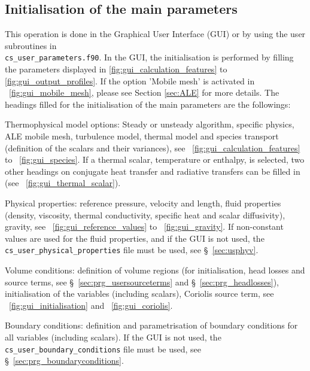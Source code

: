 {{{%
\subsection{Initialisation of the main parameters}

This operation is done in the Graphical User Interface (GUI) or by using the user subroutines in \\ \texttt{cs\_user\_parameters.f90}.
In the GUI, the initialisation is performed by filling the parameters displayed in \figurename\ref{fig:gui_calculation_features}
to \ref{fig:gui_output_profiles}. If the option 'Mobile mesh' is activated in \figurename~\ref{fig:gui_mobile_mesh},
please see Section \ref{sec:ALE} for more details. The headings filled for the initialisation of the main parameters
are the followings:
\begin{list}{-}{}
\item Thermophysical model options: Steady or unsteady algorithm, specific physics, ALE mobile mesh,
      turbulence model, thermal model and species transport (definition of the scalars and their variances),
see \figurename~\ref{fig:gui_calculation_features} to \figurename~\ref{fig:gui_species}. If a thermal scalar, temperature or enthalpy, is selected,
two other headings on conjugate heat transfer and radiative transfers can be filled in (see \figurename~\ref{fig:gui_thermal_scalar}).
\item Physical properties: reference pressure, velocity and length, fluid properties (density, viscosity, thermal conductivity,
specific heat and scalar diffusivity), gravity, see \figurename~\ref{fig:gui_reference_values} to \figurename~\ref{fig:gui_gravity}.
If non-constant values are used for the fluid properties, and if the GUI is not used, the \\ \texttt{cs\_user\_physical\_properties}
file must be used, see \S~\ref{sec:usphyv}.
\item Volume conditions: definition of volume regions (for initialisation, head losses and source terms,
see \S~\ref{sec:prg_usersourceterms} and \S~\ref{sec:prg_headlosses}), initialisation of the variables (including scalars),
Coriolis source term, see \figurename~\ref{fig:gui_initialisation} and \figurename~\ref{fig:gui_coriolis}.
\item Boundary conditions: definition and parametrisation of boundary conditions for all variables (including scalars).
If the GUI is not used, the \texttt{cs\_user\_boundary\_conditions} file must be used, see \S~\ref{sec:prg_boundaryconditions}.

\end{list}}}}
